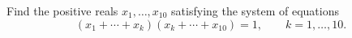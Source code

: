Find the positive reals $x_1, \ldots, x_{10}$ satisfying the system of equations
\[ (x_1 + \cdots + x_k)(x_k + \cdots + x_{10}) = 1,\qquad k = 1, \ldots, 10. \]
